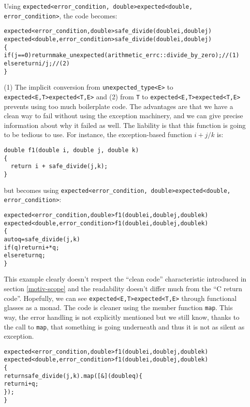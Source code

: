 \documentclass[a4paper,10pt]{article}
\newcommand{\cpp}[1]{\lstinline{#1}}
\newcommand{\suppress}[1]{\colorbox{suppress_color}{#1}}
\newcommand{\update}[1]{\colorbox{update_color}{#1}}
\begin{document}
\noindent
Using \suppress{\cpp{expected<error_condition, double>}}\update{\cpp{expected<double, error_condition>}}, the code becomes:

\begin{alltt}
\suppress{expected<error_condition, double> safe_divide(double i, double j)}
\update{expected<double,error_condition> safe_divide(double i, double j)}
\{
  if (j==0) return make_unexpected(arithmetic_errc::divide_by_zero); // (1)
  else return i / j; // (2)
\}
\end{alltt}

(1) The implicit conversion from \cpp{unexpected_type<E>} to \suppress{\cpp{expected<E,T>}}\update{\cpp{expected<T,E>}} and (2) from \cpp{T} to \suppress{\cpp{expected<E,T>}}\update{\cpp{expected<T,E>}} prevents using too much boilerplate code. The advantages are that we have a clean way to fail without using the exception machinery, and we can give precise information about why it failed as well. The liability is that this function is going to be tedious to use. For instance, the exception-based function $i + j/k$ is:

\begin{lstlisting}
double f1(double i, double j, double k)
{
  return i + safe_divide(j,k);
}
\end{lstlisting}

\noindent
but becomes using \suppress{\cpp{expected<error_condition, double>}}\update{\cpp{expected<double, error_condition>}}:

\begin{alltt}
\suppress{expected<error_condition, double> f1(double i, double j, double k)}
\update{expected<double, error_condition> f1(double i, double j, double k)}
\{
  auto q = safe_divide(j, k)
  if(q) return i + *q;
  else return q;
\}
\end{alltt}

\noindent
This example clearly doesn't respect the ``clean code'' characteristic introduced in section \ref{motiv-scope} and the readability doesn't differ much from the ``C return code''. Hopefully, we can see \suppress{\cpp{expected<E,T>}}\update{\cpp{expected<T,E>}} through functional glasses as a monad. The code is cleaner using the member function \cpp{map}. This way, the error handling is not explicitly mentioned but we still know, thanks to the call to \cpp{map}, that something is going underneath and thus it is not as silent as exception.

\begin{alltt}
\suppress{expected<error_condition, double> f1(double i, double j, double k)}
\update{expected<double, error_condition> f1(double i, double j, double k)}
\{
  return safe_divide(j, k).map([&](double q)\{
    return i + q;
  \});
\}
\end{alltt}
\end{document}
